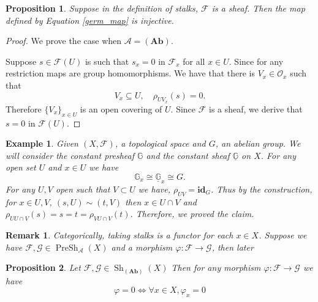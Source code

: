 \documentclass{article}
\newtheorem{proposition}{Proposition}[section]
\newtheorem{remark}{Remark}[section]
\newtheorem{example}{Example}[section]
\numberwithin{equation}{section}
\DeclareMathOperator{\PreSh}{PreSh}
\DeclareMathOperator{\Sh}{Sh}
\begin{document}
\begin{proposition}
\label{stalk_lifting}
Suppose in the definition of stalks, $\mathcal{F}$ is a sheaf. Then the map defined by Equation \ref{germ_map} is injective.
\end{proposition}

\begin{proof}
We prove the case when $\mathcal{A}=(\mathbf{Ab})$. \\
\par Suppose $s\in\mathcal{F}(U)$ is such that $s_x=0$ in $\mathcal{F}_x$ for all $x\in U$. Since for any restriction maps are group homomorphisms. We have that there is $V_x\in\mathcal{O}_x$ such that 
\begin{equation*}
V_x\subseteq U,\quad\rho_{UV_x}(s) = 0.
\end{equation*}
Therefore $\{V_x\}_{x\in U}$ is an open covering of $U$. Since $\mathcal{F}$ is a sheaf, we derive that $s=0$ in $\mathcal{F}(U)$.
\end{proof}

\begin{example}
Given $(X,\mathcal{F})$, a topological space and $G$, an abelian group. We will consider the constant presheaf $\mathbb{G}$ and the constant sheaf $\underline{\mathbb{G}}$ on $X$. For any open set $U$ and $x\in U$ we have
\begin{equation*}
\mathbb{G}_x\cong\underline{\mathbb{G}}_x\cong G.
\end{equation*}
For any $U,V$ open such that $V\subset U$ we have, $\rho_{UV}=\mathbf{id}_G$. Thus by the construction, for $x\in U,V$, $(s,U)\sim (t,V)$ then $x\in U\cap V$ and $\rho_{UU\cap V}(s) = s=t=\rho_{VU\cap V}(t)$. Therefore, we proved the claim.
\end{example}

\begin{remark}
Categorically, taking stalks is a functor for each $x\in X$. Suppose we have $\mathcal{F},\mathcal{G}\in\PreSh_\mathcal{A}(X)$ and a morphism $\varphi:\mathcal{F}\to\mathcal{G}$, then 
later
\end{remark}

\begin{proposition}
Let $\mathcal{F},\mathcal{G}\in\Sh_{(\mathbf{Ab})}(X)$ Then for any morphism $\varphi:\mathcal{F}\to\mathcal{G}$ we have
\begin{equation*}
\varphi = 0 \Leftrightarrow \forall x\in X,  \varphi_x = 0
\end{equation*}
\end{proposition}
\end{document}
